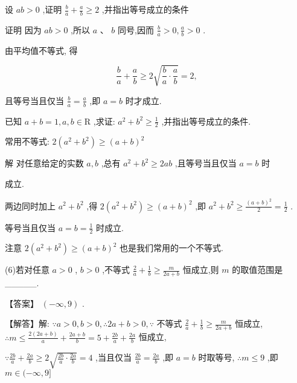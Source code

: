 \documentclass[11pt,a4paper]{article}
\begin{document}
\begin{problem} 
    设 \(\displaystyle {ab} > 0\) ,证明 \(\displaystyle \frac{b}{a} + \frac{a}{b} \geq  2\) ,并指出等号成立的条件
    \begin{jiexi}[25]
证明 因为 \(\displaystyle {ab} > 0\) ,所以 \(\displaystyle a\) 、 \(\displaystyle b\) 同号,因而 \(\displaystyle \frac{b}{a} > 0,\frac{a}{b} > 0\) .

由平均值不等式, 得

\[
\frac{b}{a} + \frac{a}{b} \geq  2\sqrt{\frac{b}{a} \cdot  \frac{a}{b}} = 2,
\]

且等号当且仅当 \(\displaystyle \frac{b}{a} = \frac{a}{b}\) ,即 \(\displaystyle a = b\) 时才成立.


\end{jiexi}
\end{problem}
\begin{problem} 

    已知 \(\displaystyle a + b = 1,a,b \in  \mathrm{R}\) ,求证: \(\displaystyle {a}^{2} + {b}^{2} \geq  \frac{1}{2}\) ,并指出等号成立的条件.
    \begin{jiexi}[25]
常用不等式: \(\displaystyle 2\left( {{a}^{2} + {b}^{2}}\right)  \geq  {\left( a + b\right) }^{2}\)

解 对任意给定的实数 \(\displaystyle a,b\) ,总有 \(\displaystyle {a}^{2} + {b}^{2} \geq  {2ab}\) ,且等号当且仅当 \(\displaystyle a = b\) 时

成立.

两边同时加上 \(\displaystyle {a}^{2} + {b}^{2}\) ,得 \(\displaystyle 2\left( {{a}^{2} + {b}^{2}}\right)  \geq  {\left( a + b\right) }^{2}\) ,即 \(\displaystyle {a}^{2} + {b}^{2} \geq  \frac{{\left( a + b\right) }^{2}}{2} = \frac{1}{2}\) .

等号当且仅当 \(\displaystyle a = b = \frac{1}{2}\) 时成立.

注意 \(\displaystyle 2\left( {{a}^{2} + {b}^{2}}\right)  \geq  {\left( a + b\right) }^{2}\) 也是我们常用的一个不等式. 
\end{jiexi}
\end{problem}
\begin{problem} 

(6)若对任意 \(\displaystyle a > 0\) , \(\displaystyle b > 0\) ,不等式 \(\displaystyle \frac{2}{a} + \frac{1}{b} \geq  \frac{m}{{2a} + b}\) 恒成立,则 \(\displaystyle m\) 的取值范围是\_\_\_\_\_. 
\begin{jiexi}
【答案】 \(\displaystyle \left( {-\infty ,9}\right)\) . 

【解答】解: \(\displaystyle \because a > 0,b > 0,\therefore {2a} + b > 0,\because\) 不等式 \(\displaystyle \frac{2}{a} + \frac{1}{b} \geq  \frac{m}{{2a} + b}\) 恒成立, \(\displaystyle \therefore m \leq  \frac{2\left( {{2a} + b}\right) }{a} + \frac{{2a} + b}{b} = 5 + \frac{2b}{a} + \frac{2a}{b}\) 恒成立,

\(\displaystyle \because \frac{2b}{a} + \frac{2a}{b} \geq  2\sqrt{\frac{2b}{a} \cdot  \frac{2a}{b}} = 4\) ,当且仅当 \(\displaystyle \frac{2b}{a} = \frac{2a}{b}\) ,即 \(\displaystyle a = b\) 时取等号, \(\displaystyle \therefore m \leq  9\) ,即 \(\displaystyle m \in  ( - \infty ,9\rbrack\)

\end{jiexi}
\end{problem}
\end{document}
